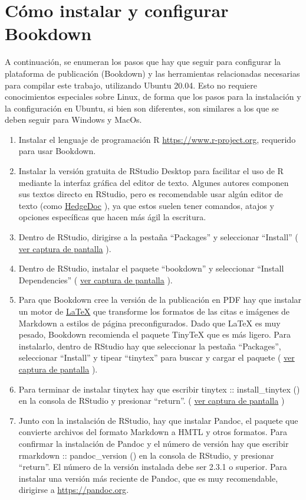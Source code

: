 \documentclass[
]{book}
\begin{document}
\hypertarget{cuxf3mo-instalar-y-configurar-bookdown}{%
\section{Cómo instalar y configurar Bookdown}\label{cuxf3mo-instalar-y-configurar-bookdown}}

A continuación, se enumeran los pasos que hay que seguir para configurar la plataforma de publicación (Bookdown) y las herramientas relacionadas necesarias para compilar este trabajo, utilizando Ubuntu 20.04. Esto no requiere conocimientos especiales sobre Linux, de forma que los pasos para la instalación y la configuración en Ubuntu, si bien son diferentes, son similares a los que se deben seguir para Windows y MacOs.

\begin{enumerate}
\def\labelenumi{\arabic{enumi}.}
\item
  Instalar el lenguaje de programación R \url{https://www.r-project.org}, requerido para usar Bookdown.
\item
  Instalar la versión gratuita de RStudio Desktop para facilitar el uso de R mediante la interfaz gráfica del editor de texto. Algunes autores componen sus textos directo en RStudio, pero es recomendable usar algún editor de texto (como \href{https://docutopia.tupale.co/}{HedgeDoc} ), ya que estos suelen tener comandos, atajos y opciones específicas que hacen más ágil la escritura.
\item
  Dentro de RStudio, dirigirse a la pestaña ``Packages'' y seleccionar ``Install'' ( \href{images/packages-install.png}{ver captura de pantalla} ).
\item
  Dentro de RStudio, instalar el paquete ``bookdown'' y seleccionar ``Install Dependencies'' ( \href{images/bookdown-install.png}{ver captura de pantalla} ).
\item
  Para que Bookdown cree la versión de la publicación en PDF hay que instalar un motor de \href{https://en.wikipedia.org/wiki/LaTeX}{LaTeX} que transforme los formatos de las citas e imágenes de Markdown a estilos de página preconfigurados. Dado que LaTeX es muy pesado, Bookdown recomienda el paquete TinyTeX que es más ligero. Para instalarlo, dentro de RStudio hay que seleccionar la pestaña ``Packages'', seleccionar ``Install'' y tipear ``tinytex'' para buscar y cargar el paquete ( \href{images/tinytex-install.png}{ver captura de pantalla} ).
\item
  Para terminar de instalar tinytex hay que escribir tinytex :: install\_tinytex () en la consola de RStudio y presionar ``return''. ( \href{images/tinytex-finish.png}{ver captura de pantalla} )
\item
  Junto con la instalación de RStudio, hay que instalar Pandoc, el paquete que convierte archivos del formato Markdown a HMTL y otros formatos. Para confirmar la instalación de Pandoc y el número de versión hay que escribir rmarkdown :: pandoc\_version () en la consola de RStudio, y presionar ``return''. El número de la versión instalada debe ser 2.3.1 o superior. Para instalar una versión más reciente de Pandoc, que es muy recomendable, dirigirse a \url{https://pandoc.org}.
\end{enumerate}
\end{document}
